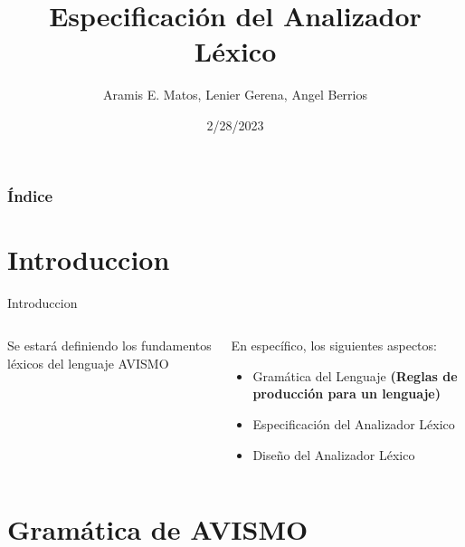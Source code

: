 \documentclass[14pt, aspectratio=169]{beamer}
\title{Especificación del Analizador Léxico}
\author{Aramis E. Matos, Lenier Gerena, Angel Berrios}
\date{2/28/2023}
\begin{document}
\maketitle
\begin{frame}[allowframebreaks]
    \frametitle{Índice}
    \begin{multicols}{2}
        \tableofcontents
    \end{multicols}
\end{frame}

\section{Introduccion}

\begin{frame}{Introduccion}
    \begin{columns}
        \begin{column}{0.5\textwidth}
            Se estará definiendo los fundamentos léxicos del lenguaje AVISMO \cite{narciso_farias_gramatica_2012}
        \end{column}
        \begin{column}{.5\textwidth}
            En específico, los siguientes aspectos:
            \begin{itemize}
                \item Gramática del Lenguaje \textbf{(Reglas de producción para un lenguaje)}
                \item Especificación del Analizador Léxico
                \item Diseño del Analizador Léxico
            \end{itemize}
        \end{column}
    \end{columns}

\end{frame}

\section{Gramática de AVISMO}
\end{document}
